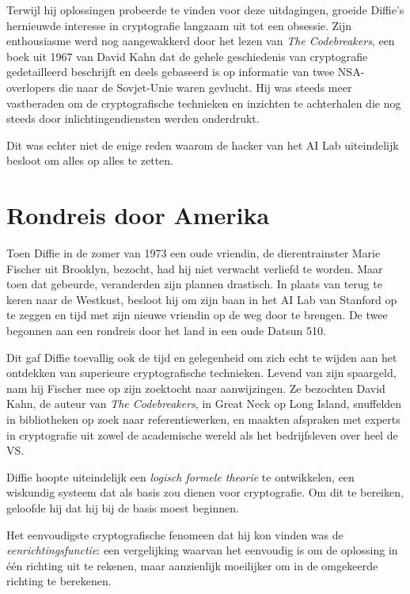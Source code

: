\documentclass[smalldemyvopaper,11pt,twoside,onecolumn,openright,extrafontsizes,hidelinks]{memoir}
\begin{document}
Terwijl hij oplossingen probeerde te vinden voor deze uitdagingen,
groeide Diffie's hernieuwde interesse in cryptografie langzaam uit tot
een obsessie. Zijn enthousiasme werd nog aangewakkerd door het lezen van
\emph{The Codebreakers}, een boek uit 1967 van David Kahn dat de gehele
geschiedenis van cryptografie gedetailleerd beschrijft en deels
gebaseerd is op informatie van twee NSA-overlopers die naar de
Sovjet-Unie waren gevlucht. Hij was steeds meer vastberaden om de
cryptografische technieken en inzichten te achterhalen die nog steeds
door inlichtingendiensten werden onderdrukt.

Dit was echter niet de enige reden waarom de hacker van het AI Lab
uiteindelijk besloot om alles op alles te zetten.

\section{Rondreis door Amerika}\label{rondreis-door-amerika}

Toen Diffie in de zomer van 1973 een oude vriendin, de dierentrainster
Marie Fischer uit Brooklyn, bezocht, had hij niet verwacht verliefd te
worden. Maar toen dat gebeurde, veranderden zijn plannen drastisch. In
plaats van terug te keren naar de Westkust, besloot hij om zijn baan in
het AI Lab van Stanford op te zeggen en tijd met zijn nieuwe vriendin op
de weg door te brengen. De twee begonnen aan een rondreis door het land
in een oude Datsun 510.

Dit gaf Diffie toevallig ook de tijd en gelegenheid om zich echt te
wijden aan het ontdekken van superieure cryptografische technieken.
Levend van zijn spaargeld, nam hij Fischer mee op zijn zoektocht naar
aanwijzingen. Ze bezochten David Kahn, de auteur van \emph{The
Codebreakers}, in Great Neck op Long Island, snuffelden in bibliotheken
op zoek naar referentiewerken, en maakten afspraken met experts in
cryptografie uit zowel de academische wereld als het bedrijfsleven over
heel de VS.

Diffie hoopte uiteindelijk een \emph{logisch formele theorie} te
ontwikkelen, een wiskundig systeem dat als basis zou dienen voor
cryptografie. Om dit te bereiken, geloofde hij dat hij bij de basis
moest beginnen.

Het eenvoudigste cryptografische fenomeen dat hij kon vinden was de
\emph{eenrichtingsfunctie}: een vergelijking waarvan het eenvoudig is om
de oplossing in één richting uit te rekenen, maar aanzienlijk moeilijker
om in de omgekeerde richting te berekenen.
\end{document}
